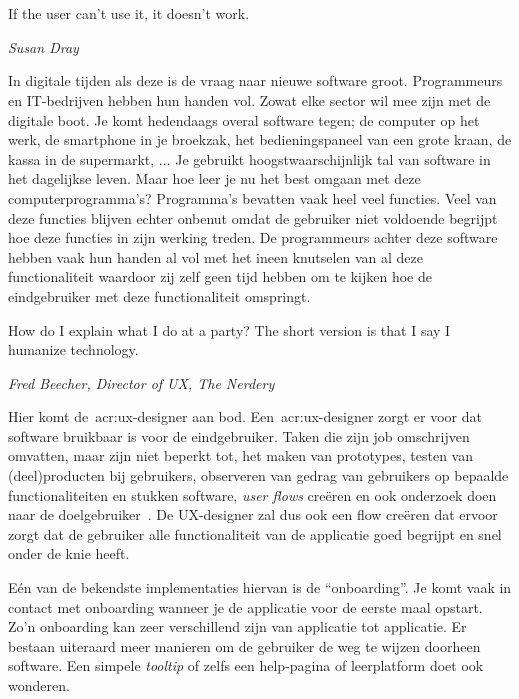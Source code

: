 
\chapter{}
\label{ch:inleiding}

\epigraph{If the user can't use it, it doesn't work.}{\textit{Susan Dray}}

In digitale tijden als deze is de vraag naar nieuwe software groot. Programmeurs en IT-bedrijven hebben hun handen vol. Zowat elke sector wil mee zijn met de digitale boot. Je komt hedendaags overal software tegen; de computer op het werk, de smartphone in je broekzak, het bedieningspaneel van een grote kraan, de kassa in de supermarkt, $\dots$ Je gebruikt hoogstwaarschijnlijk tal van software in het dagelijkse leven. Maar hoe leer je nu het best omgaan met deze computerprogramma's? Programma's bevatten vaak heel veel functies. Veel van deze functies blijven echter onbenut omdat de gebruiker niet voldoende begrijpt hoe deze functies in zijn werking treden. De programmeurs achter deze software hebben vaak hun handen al vol met het ineen knutselen van al deze functionaliteit waardoor zij zelf geen tijd hebben om te kijken hoe de eindgebruiker met deze functionaliteit omspringt.

\epigraph{How do I explain what I do at a party? The short version is that I say I humanize technology.}{\textit{Fred Beecher, Director of UX, The Nerdery}}

Hier komt de~\acrshort{acr:ux}-designer aan bod. Een~\acrshort{acr:ux}-designer zorgt er voor dat software bruikbaar is voor de eindgebruiker. Taken die zijn job omschrijven omvatten, maar zijn niet beperkt tot, het maken van prototypes, testen van (deel)producten bij gebruikers, observeren van gedrag van gebruikers op bepaalde functionaliteiten en stukken software, \textit{user flows} creëren en ook onderzoek doen naar de doelgebruiker~\autocite{White2020}. De UX-designer zal dus ook een flow creëren dat ervoor zorgt dat de gebruiker alle functionaliteit van de applicatie goed begrijpt en snel onder de knie heeft.

Eén van de bekendste implementaties hiervan is de ``onboarding''. Je komt vaak in contact met onboarding wanneer je de applicatie voor de eerste maal opstart. Zo'n onboarding kan zeer verschillend zijn van applicatie tot applicatie.
Er bestaan uiteraard meer manieren om de gebruiker de weg te wijzen doorheen software. Een simpele \textit{tooltip} of zelfs een help-pagina of leerplatform doet ook wonderen.

